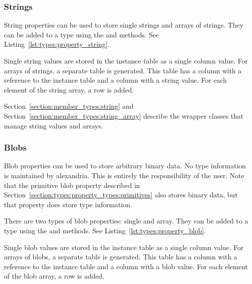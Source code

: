 \subsubsection{Strings}
\label{section:types:property_types:strings}

String properties can be used to store single strings and arrays of strings. They can be added to a type using the  and  methods. See Listing~\ref{lst:types:property_string}.



Single string values are stored in the instance table as a single column value. For arrays of strings, a separate table is generated. This table has a column with a reference to the instance table and a column with a string value. For each element of the string array, a row is added.

Section~\ref{section:member_types:string} and Section~\ref{section:member_types:string_array} describe the wrapper classes that manage string values and arrays.

\subsubsection{Blobs}
\label{section:types:property_types:blobs}

Blob properties can be used to store arbitrary binary data. No type information is maintained by \gls{alexandria}. This is entirely the responsibility of the user. Note that the primitive blob property described in Section~\ref{section:types:property_types:primitives} also stores binary data, but that property does store type information.

There are two types of blob properties: single and array. They can be added to a type using the  and  methods. See Listing~\ref{lst:types:property_blob}.



Single blob values are stored in the instance table as a single column value. For arrays of blobs, a separate table is generated. This table has a column with a reference to the instance table and a column with a blob value. For each element of the blob array, a row is added.

